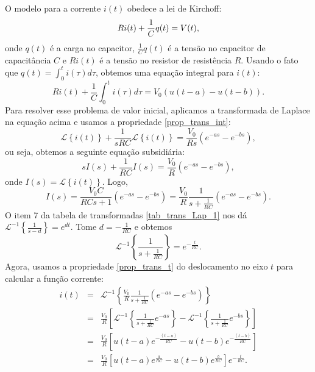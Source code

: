 O modelo para a corrente $i(t)$ obedece a lei de Kirchoff:
\begin{equation}{\label{modelo_corrente_0}}
 Ri(t)+\frac{1}{C}q(t)=V(t),
\end{equation}
onde $q(t)$ é a carga no capacitor, $\frac{1}{C}q(t)$ é a tensão no capacitor de capacitância $C$ e $Ri(t)$ é a tensão no resistor de resistência $R$. Usando o fato que $q(t)=\int_0^t i(\tau)d\tau$, obtemos uma equação integral para $i(t)$:
\begin{equation}
Ri(t)+\frac{1}{C}\int_0^t i(\tau)d\tau=V_0\left(u(t-a)-u(t-b)\right).
\end{equation}
Para resolver esse problema de valor inicial, aplicamos a transformada de Laplace na equação acima e usamos a propriedade \ref{prop_trans_int}:
\begin{equation}
\mathcal{L}\left\{i(t)\right\}+\frac{1}{sRC}\mathcal{L}\left\{i(t)\right\}=\frac{V_0}{Rs}\left(e^{-as}-e^{-bs}\right),
\end{equation}
ou seja, obtemos a seguinte equação subsidiária:
\begin{equation}
sI(s)+\frac{1}{RC}I(s)=\frac{V_0}{R}\left(e^{-as}-e^{-bs}\right),
\end{equation}
onde $I(s)=\mathcal{L}\left\{i(t)\right\}$. Logo,
\begin{equation}
I(s)=\frac{V_0 C}{RCs+1}\left(e^{-as}-e^{-bs}\right)=\frac{V_0}{R}\frac{1}{s+\frac{1}{RC}}\left(e^{-as}-e^{-bs}\right).
\end{equation}
O item 7 da tabela de transformadas \ref{tab_trans_Lap_1} nos dá $\mathcal{L}^{-1}\left\{\frac{1}{s-d}\right\}=e^{dt}$. Tome $d=-\frac{1}{RC}$ e obtemos
\begin{equation}
\mathcal{L}^{-1}\left\{\frac{1}{s+\frac{1}{RC}}\right\}=e^{-\frac{t}{RC}}.
\end{equation}
Agora, usamos a propriedade \ref{prop_trans_t} do deslocamento no eixo $t$ para calcular a função corrente:
\begin{eqnarray*}
i(t)&=&\mathcal{L}^{-1}\left\{\frac{V_0}{R}\frac{1}{s+\frac{1}{RC}}\left(e^{-as}-e^{-bs}\right)\right\}\\
&=&\frac{V_0}{R}\left[\mathcal{L}^{-1}\left\{\frac{1}{s+\frac{1}{RC}}e^{-as}\right\}-\mathcal{L}^{-1}\left\{\frac{1}{s+\frac{1}{RC}}e^{-bs}\right\}\right]\\
&=&\frac{V_0}{R}\left[u(t-a)e^{-\frac{(t-a)}{RC}}-u(t-b)e^{-\frac{(t-b)}{RC}}\right]\\
&=&\frac{V_0}{R}\left[u(t-a)e^{\frac{a}{RC}}-u(t-b)e^{\frac{b}{RC}}\right]e^{-\frac{t}{RC}}.
\end{eqnarray*}

